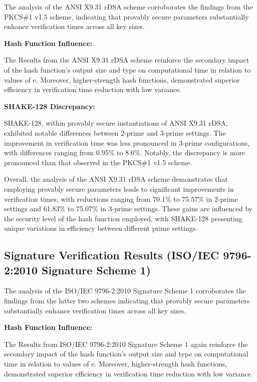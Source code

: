 \documentclass[]{final_report}
\theoremstyle{definition}
\begin{document}
The analysis of the ANSI X9.31 rDSA scheme corroborates the findings from the PKCS\#1 v1.5 scheme, indicating that provably secure parameters substantially enhance verification times across all key sizes.

\textbf{Hash Function Influence:}  

The Results from the ANSI X9.31 rDSA scheme reinforce the secondary impact of the hash function's output size and type on computational time in relation to values of e. Moreover, higher-strength hash functions, demonstrated superior efficiency in verification time reduction with low variance.

\textbf{SHAKE-128 Discrepancy:} 

SHAKE-128, within provably secure instantiations of ANSI X9.31 rDSA, exhibited notable differences between 2-prime and 3-prime settings. The improvement in verification time was less pronounced in 3-prime configurations, with differences ranging from 0.95\% to 8.6\%. Notably, the discrepancy is more pronounced than that observed in the PKCS\#1 v1.5 scheme.

Overall, the analysis of the ANSI X9.31 rDSA scheme demonstrates that employing provably secure parameters leads to significant improvements in verification times, with reductions ranging from 70.1\% to 75.57\% in 2-prime settings and 61.83\% to 75.07\% in 3-prime settings. These gains are influenced by the security level of the hash function employed, with SHAKE-128 presenting unique variations in efficiency between different prime settings.

\newpage
\subsection{Signature Verification Results (ISO/IEC 9796-2:2010 Signature Scheme 1)}

The analysis of the ISO/IEC 9796-2:2010 Signature Scheme 1 corroborates the findings from the latter two schemes indicating that provably secure parameters substantially enhance verification times across all key sizes.

\textbf{Hash Function Influence:}  

The Results from ISO/IEC 9796-2:2010 Signature Scheme 1 again reinforce the secondary impact of the hash function's output size and type on computational time in relation to values of e. Moreover, higher-strength hash functions, demonstrated superior efficiency in verification time reduction with low variance.
\end{document}
